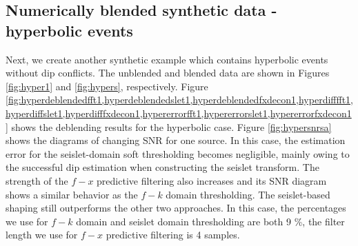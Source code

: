 

\subsection{Numerically blended synthetic data - hyperbolic events}
Next, we create another synthetic example which contains hyperbolic events without dip conflicts. The unblended and blended data are shown in Figures \ref{fig:hyper1} and \ref{fig:hypers}, respectively. Figure \ref{fig:hyperdeblendedfft1,hyperdeblendedslet1,hyperdeblendedfxdecon1,hyperdifffft1,hyperdiffslet1,hyperdifffxdecon1,hypererrorfft1,hypererrorslet1,hypererrorfxdecon1}
shows the deblending results for the hyperbolic case. Figure \ref{fig:hypersnrsa} shows the diagrams of changing SNR for one source. In this case, the estimation error for the seislet-domain soft thresholding becomes negligible, mainly owing to the successful dip estimation when constructing the seislet transform. The strength of the $f-x$ predictive filtering also increases and its SNR diagram shows a similar behavior as the $f-k$ domain thresholding. The seislet-based shaping still outperforms the other two approaches. In this case, the percentages we use for $f-k$ domain and seislet domain thresholding are both 9 \%, the filter length we use for $f-x$ predictive filtering is 4 samples. 


